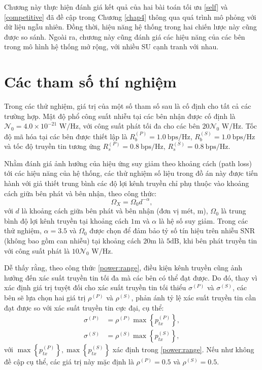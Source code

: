 \documentclass[../main.tex]{subfiles}
\begin{document}
\label{chap5}

Chương này thực hiện đánh giá kết quả của hai bài toán tối ưu \eqref{self} và \eqref{competitive} đã đề cập trong Chương \ref{chap4} thông qua quá trình mô phỏng với dữ liệu ngẫu nhiên. Đồng thời, hiệu năng hệ thống trong hai chiến lược này cũng được so sánh. Ngoài ra, chương này cũng đánh giá các hiệu năng của các bên trong mô hình hệ thống mở rộng, với nhiều SU cạnh tranh với nhau.

\section{Các tham số thí nghiệm}

Trong các thử nghiệm, giá trị của một số tham số sau là cố định cho tất cả các trường hợp. Mật độ phổ công suất nhiễu tại các bên nhận được cố định là $\mathcal{N}_0 = 4.0\times10^{-21}\text{ W/Hz}$, với công suất phát tối đa cho các bên $20\mathcal{N}_0 \text{ W/Hz}$. Tốc độ mã hóa tại các bên được thiết lập là $R_b^{(P)} = 1.0 \ \text{bps/Hz}$, $R_b^{(S)} = 1.0\ \text{bps/Hz}$ và tốc độ truyền tin tương ứng $R_s^{(P)} = 0.8\ \text{bps/Hz}$, $R_s^{(S)} = 0.8\ \text{bps/Hz}$.

Nhằm đánh giá ảnh hưởng của hiệu ứng suy giảm theo khoảng cách (path loss) tới các hiệu năng của hệ thống, các thử nghiệm số liệu trong đồ án này được tiến hành với giả thiết trung bình các độ lợi kênh truyền chỉ phụ thuộc vào khoảng cách giữa bên phát và bên nhận, theo công thức:
\begin{equation}\label{genomega}
    \Omega_X = \Omega_0d^{-\alpha},
\end{equation}
với $d$ là khoảng cách giữa bên phát và bên nhận (đơn vị mét, $\text{m}$), $\Omega_0$ là trung bình độ lợi kênh truyền tại khoảng cách $1\text{m}$ và $\alpha$ là hệ số suy giảm. Trong các thử nghiệm, $\alpha = 3.5$ và $\Omega_0$ được chọn để đảm bảo tỷ số tín hiệu trên nhiễu SNR (không bao gồm can nhiễu) tại khoảng cách $20 \text{m}$ là $5 \text{dB}$, khi bên phát truyền tin với công suất phát là $10\mathcal{N}_0 \text{ W/Hz}$.

Dễ thấy rằng, theo công thức \eqref{power:range}, điều kiện kênh truyền cũng ảnh hưởng đến xác suất truyền tin tối đa mà các bên có thể đạt được. Do đó, thay vì xác định giá trị tuyệt đối cho xác suất truyền tin tối thiểu $\sigma^{(P)}$ và $\sigma^{(S)}$, các bên sẽ lựa chọn hai giá trị $\rho^{(P)}$ và $\rho^{(S)}$, phản ánh tỷ lệ xác suất truyền tin cần đạt được so với xác suất truyền tin cực đại, cụ thể:
\begin{equation}
\begin{aligned}
    \sigma^{(P)} &= \rho^{(P)}\max\left\{p_{tx}^{(P)}\right\}, \\
    \sigma^{(S)} &= \rho^{(S)}\max\left\{p_{tx}^{(S)}\right\},
\end{aligned}
\end{equation}
với $\max\left\{p_{tx}^{(P)}\right\}, \max\left\{p_{tx}^{(S)}\right\}$ xác định trong \eqref{power:range}. Nếu như không đề cập cụ thể, các giá trị này mặc định là $\rho^{(P)} = 0.5$ và $\rho^{(S)} = 0.5$.
\end{document}
